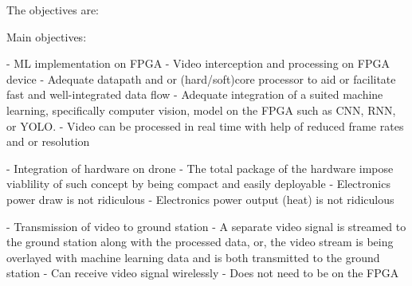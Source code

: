 The objectives are:


Main objectives:

- ML implementation on FPGA
    - Video interception and processing on FPGA device
    - Adequate datapath and or (hard/soft)core processor to aid
      or facilitate fast and well-integrated data flow
    - Adequate integration of a suited machine learning, specifically
      computer vision, model on the FPGA such as CNN, RNN, or YOLO.
    - Video can be processed in real time with help of reduced
      frame rates and or resolution

- Integration of hardware on drone
    - The total package of the hardware impose viablility of such concept by
      being compact and easily deployable
    - Electronics power draw is not ridiculous
    - Electronics power output (heat) is not ridiculous

- Transmission of video to ground station
    - A separate video signal is streamed to the ground station along with
      the processed data, or, the video stream is being overlayed with
      machine learning data and is both transmitted to the ground station
    - Can receive video signal wirelessly
    - Does not need to be on the FPGA
